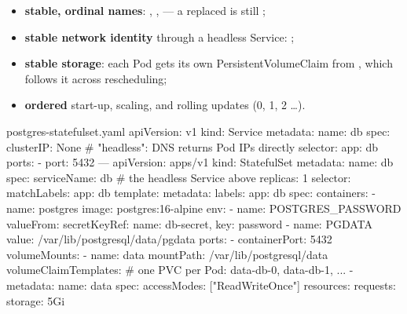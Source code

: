 \begin{itemize}
  \item \textbf{stable, ordinal names}: , ,  --- a
        replaced  is still ;
  \item \textbf{stable network identity} through a headless Service:
        ;
  \item \textbf{stable storage}: each Pod gets its own PersistentVolumeClaim
        from , which follows it across rescheduling;
  \item \textbf{ordered} start-up, scaling, and rolling updates (0, 1, 2 \ldots).
\end{itemize}

\begin{center}
\end{center}

\begin{yamlcode}{postgres-statefulset.yaml}
apiVersion: v1
kind: Service
metadata:
  name: db
spec:
  clusterIP: None              # "headless": DNS returns Pod IPs directly
  selector:
    app: db
  ports:
    - port: 5432
---
apiVersion: apps/v1
kind: StatefulSet
metadata:
  name: db
spec:
  serviceName: db              # the headless Service above
  replicas: 1
  selector:
    matchLabels:
      app: db
  template:
    metadata:
      labels:
        app: db
    spec:
      containers:
        - name: postgres
          image: postgres:16-alpine
          env:
            - name: POSTGRES_PASSWORD
              valueFrom:
                secretKeyRef: { name: db-secret, key: password }
            - name: PGDATA
              value: /var/lib/postgresql/data/pgdata
          ports:
            - containerPort: 5432
          volumeMounts:
            - name: data
              mountPath: /var/lib/postgresql/data
  volumeClaimTemplates:        # one PVC per Pod: data-db-0, data-db-1, ...
    - metadata:
        name: data
      spec:
        accessModes: ["ReadWriteOnce"]
        resources:
          requests:
            storage: 5Gi
\end{yamlcode}

